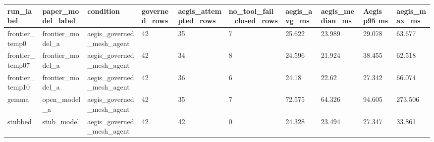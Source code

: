 \begin{tabular}{llllllllll}
 \hline
run\_label & paper\_model\_label & condition & governed\_rows & aegis\_attempted\_rows & no\_tool\_fail\_closed\_rows & aegis\_avg\_ms & aegis\_median\_ms & Aegis p95 ms & aegis\_max\_ms \\
 \hline
frontier\_temp0 & frontier\_model\_a & aegis\_governed\_mesh\_agent & 42 & 35 & 7 & 25.622 & 23.989 & 29.078 & 63.677 \\
frontier\_temp07 & frontier\_model\_a & aegis\_governed\_mesh\_agent & 42 & 34 & 8 & 24.596 & 21.924 & 38.455 & 62.518 \\
frontier\_temp10 & frontier\_model\_a & aegis\_governed\_mesh\_agent & 42 & 36 & 6 & 24.18 & 22.62 & 27.342 & 66.074 \\
gemma & open\_model\_a & aegis\_governed\_mesh\_agent & 42 & 35 & 7 & 72.575 & 64.326 & 94.605 & 273.506 \\
stubbed & stub\_model & aegis\_governed\_mesh\_agent & 42 & 42 & 0 & 24.328 & 23.494 & 27.347 & 33.861 \\
 \hline
\end{tabular}
